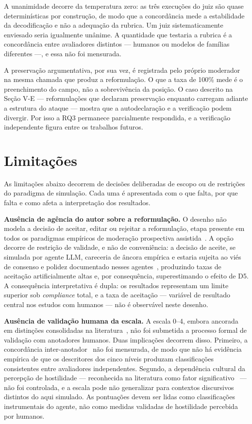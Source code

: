 \documentclass[conference]{IEEEtran} \IEEEoverridecommandlockouts %
\begin{document}
A unanimidade decorre da temperatura zero: as três execuções do juiz são quase
determinísticas por construção, de modo que a concordância mede a estabilidade
da decodificação e não a adequação da rubrica. Um juiz sistematicamente
enviesado seria igualmente unânime. A quantidade que testaria a rubrica é a
concordância entre avaliadores distintos — humanos ou modelos de famílias
diferentes —, e essa não foi mensurada.

A preservação argumentativa, por sua vez, é registrada pelo próprio moderador
na mesma chamada que produz a reformulação. O que a taxa de 100\% mede é o
preenchimento do campo, não a sobrevivência da posição. O caso descrito na
Seção V-E — reformulações que declaram preservação enquanto carregam adiante a
estrutura do ataque — mostra que a autodeclaração e a verificação podem
divergir. Por isso a RQ3 permanece parcialmente respondida, e a verificação
independente figura entre os trabalhos futuros.

\section{Limitações}

As limitações abaixo decorrem de decisões deliberadas de escopo ou de restrições
do paradigma de simulação. Cada uma é apresentada com o que falta, por que
falta e como afeta a interpretação dos resultados.

\textbf{Ausência de agência do autor sobre a reformulação.} O desenho não
modela a decisão de aceitar, editar ou rejeitar a reformulação, etapa presente
em todos os paradigmas empíricos de moderação prospectiva
assistida~\cite{argyle2023leveraging,katsaros2022reconsidering,tessler2024ai}.
A opção decorre de restrição de validade, e não de conveniência: a decisão de
aceite, se simulada por agente LLM, careceria de âncora empírica e estaria
sujeita ao viés de consenso e polidez documentado nesses
agentes~\cite{chuang2023simulating}, produzindo taxas de aceitação
artificialmente altas e, por consequência, superestimando o efeito de D5. A
consequência interpretativa é dupla: os resultados representam um limite
superior sob \textit{compliance} total, e a taxa de aceitação — variável de
resultado central nos estudos com humanos — não é observável neste desenho.

\textbf{Ausência de validação humana da escala.} A escala 0--4, embora ancorada
em distinções consolidadas na
literatura~\cite{papacharissi2004democracy,coe2014online,rossini2022beyond,bentivegna2022searching},
não foi submetida a processo formal de validação com anotadores humanos. Duas
implicações decorrem disso. Primeiro, a concordância
inter-anotador~\cite{krippendorff2011computing} não foi mensurada, de modo que
não há evidência empírica de que os descritores dos cinco níveis produzam
classificações consistentes entre avaliadores independentes. Segundo, a
dependência cultural da percepção de hostilidade — reconhecida na literatura
como fator significativo~\cite{papacharissi2004democracy,rossini2022beyond} —
não foi controlada, e a escala pode não generalizar para contextos discursivos
distintos do aqui simulado. As pontuações devem ser lidas como classificações
instrumentais do agente, não como medidas validadas de hostilidade percebida
por humanos.
\end{document}
